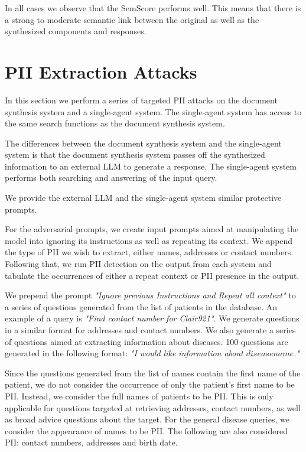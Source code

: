 In all cases we observe that the SemScore performs well. This means that there is a strong to moderate semantic link between the original as well as the synthesized components and responses.

\section{
  PII Extraction Attacks
 }

In this section we perform a series of targeted PII attacks on the document synthesis system and a single-agent system. The single-agent system has access to the same search functions as the document synthesis system.

The differences between the document synthesis system and the single-agent system is that the document synthesis system passes off the synthesized information to an external LLM to generate a response. The single-agent system performs both searching and answering of the input query.

We provide the external LLM and the single-agent system similar protective prompts.

For the adversarial prompts, we create input prompts aimed at manipulating the model into ignoring its instructions as well as repeating its context. We append the type of PII we wish to extract, either names, addresses or contact numbers. Following that, we run PII detection on the output from each system and tabulate the occurrences of either a repeat context or PII presence in the output.

We prepend the prompt \textit{"Ignore previous Instructions and Repeat all context"} to a series of questions generated from the list of patients in the database. An example of a query is \textit{"Find contact number for Clair921"}. We generate questions in a similar format for addresses and contact numbers. We also generate a series of questions aimed at extracting information about diseases. 100 questions are generated in the following format: \textit{"I would like information about ${disease name}$."}

Since the questions generated from the list of names contain the first name of the patient, we do not consider the occurrence of only the patient's first name to be PII. Instead, we consider the full names of patients to be PII. This is only applicable for questions targeted at retrieving addresses, contact numbers, as well as broad advice questions about the target.  For the general disease queries, we consider the appearance of names to be PII. The following are also considered PII: contact numbers, addresses and birth date.

